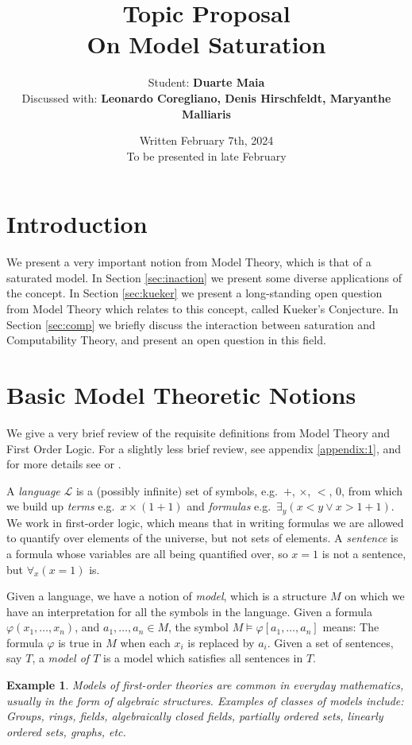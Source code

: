 \documentclass{article}
\title{Topic Proposal\\On Model Saturation}
\author{Student: \textbf{Duarte Maia}\\[1ex]Discussed with: \textbf{Leonardo Coregliano, Denis Hirschfeldt, Maryanthe Malliaris}}
\date{Written February 7th, 2024\\
To be presented in late February}
\newtheorem{example}[theorem]{Example}
\theoremstyle{nonumberplain}
\newcommand{\Lang}{\mathcal{L}}
\begin{document}
\maketitle

\tableofcontents

\section{Introduction}

We present a very important notion from Model Theory, which is that of a saturated model. In Section \ref{sec:inaction} we present some diverse applications of the concept. In Section \ref{sec:kueker} we present a long-standing open question from Model Theory which relates to this concept, called Kueker's Conjecture. In Section \ref{sec:comp} we briefly discuss the interaction between saturation and Computability Theory, and present an open question in this field.

\section{Basic Model Theoretic Notions}

We give a very brief review of the requisite definitions from Model Theory and First Order Logic. For a slightly less brief review, see appendix \ref{appendix:1}, and for more details see \cite{cnk} or \cite{shoenfield}.

A \emph{language} $\Lang$ is a (possibly infinite) set of symbols, e.g.\ $+$, $\times$, $<$, $0$, from which we build up \emph{terms} e.g.\ $x \times (1 + 1)$ and \emph{formulas} e.g.\ $\exists_y (x < y \lor x > 1+1)$. We work in first-order logic, which means that in writing formulas we are allowed to quantify over elements of the universe, but not sets of elements. A \emph{sentence} is a formula whose variables are all being quantified over, so $x=1$ is not a sentence, but $\forall_x (x=1)$ is.

Given a language, we have a notion of \emph{model}, which is a structure $M$ on which we have an interpretation for all the symbols in the language. Given a formula $\varphi(x_1, \dots, x_n)$, and $a_1, \dots, a_n \in M$, the symbol ${M \vDash \varphi[a_1, \dots, a_n]}$ means: The formula $\varphi$ is true in $M$ when each $x_i$ is replaced by $a_i$. Given a set of sentences, say $T$, a \emph{model of $T$} is a model which satisfies all sentences in $T$.

\begin{example}
Models of first-order theories are common in everyday mathematics, usually in the form of algebraic structures. Examples of classes of models include: Groups, rings, fields, algebraically closed fields, partially ordered sets, linearly ordered sets, graphs, etc.
\end{example}
\end{document}
